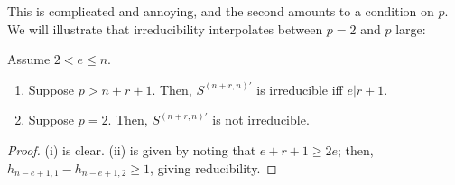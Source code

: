 \documentclass{amsart}
\begin{document}
This is complicated and annoying, and the second amounts to a condition on $p$.
We will illustrate that irreducibility interpolates between $p = 2$ and $p$ large:
\begin{corollary}
  Assume $2 < e \leq n$.
  \begin{enumerate}[label={(\roman*)}]
    \item Suppose $p > n + r + 1$. Then, $S^{(n + r,n)'}$ is irreducible iff $e | r + 1$.
    \item Suppose $p = 2$. Then, $S^{(n+r,n)'}$ is not irreducible.
  \end{enumerate}
\end{corollary}
\begin{proof}
  (i) is clear.
  (ii) is given by noting that $e + r + 1 \geq 2e$;
  then, $h_{n-e+1,1} - h_{n-e+1,2} \geq 1$, giving reducibility.
\end{proof}
\end{document}
